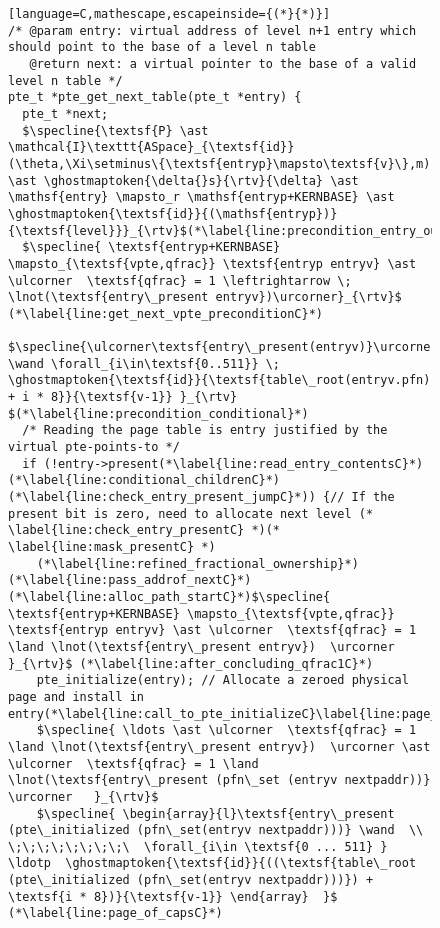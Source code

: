 \begin{figure}\footnotesize
\ifPLDI
\begin{lstlisting}[language=C,mathescape,escapeinside={(*}{*)}]
/* @param entry: virtual address of level n+1 entry which should point to the base of a level n table
   @return next: a virtual pointer to the base of a valid level n table */
pte_t *pte_get_next_table(pte_t *entry) {
  pte_t *next;
  $\specline{\textsf{P} \ast \mathcal{I}\texttt{ASpace}_{\textsf{id}}(\theta,\Xi\setminus\{\textsf{entryp}\mapsto\textsf{v}\},m) \ast \ghostmaptoken{\delta{}s}{\rtv}{\delta} \ast \mathsf{entry} \mapsto_r \mathsf{entryp+KERNBASE} \ast \ghostmaptoken{\textsf{id}}{(\mathsf{entryp})}{\textsf{level}}}_{\rtv}$(*\label{line:precondition_entry_out}*)
  $\specline{ \textsf{entryp+KERNBASE} \mapsto_{\textsf{vpte,qfrac}} \textsf{entryp entryv} \ast \ulcorner  \textsf{qfrac} = 1 \leftrightarrow \; \lnot(\textsf{entry\_present entryv})\urcorner}_{\rtv}$ (*\label{line:get_next_vpte_preconditionC}*)
  $\specline{\ulcorner\textsf{entry\_present(entryv)}\urcorner \wand \forall_{i\in\textsf{0..511}} \; \ghostmaptoken{\textsf{id}}{\textsf{table\_root(entryv.pfn) + i * 8}}{\textsf{v-1}} }_{\rtv} $(*\label{line:precondition_conditional}*) 
  /* Reading the page table is entry justified by the virtual pte-points-to */
  if (!entry->present(*\label{line:read_entry_contentsC}*)(*\label{line:conditional_childrenC}*)(*\label{line:check_entry_present_jumpC}*)) {// If the present bit is zero, need to allocate next level (* \label{line:check_entry_presentC} *)(* \label{line:mask_presentC} *) 
    (*\label{line:refined_fractional_ownership}*)(*\label{line:pass_addrof_nextC}*)(*\label{line:alloc_path_startC}*)$\specline{ \textsf{entryp+KERNBASE} \mapsto_{\textsf{vpte,qfrac}} \textsf{entryp entryv} \ast \ulcorner  \textsf{qfrac} = 1 \land \lnot(\textsf{entry\_present entryv})  \urcorner }_{\rtv}$ (*\label{line:after_concluding_qfrac1C}*)
    pte_initialize(entry); // Allocate a zeroed physical page and install in entry(*\label{line:call_to_pte_initializeC}\label{line:page_of_capsC}*)
    $\specline{ \ldots \ast \ulcorner  \textsf{qfrac} = 1 \land \lnot(\textsf{entry\_present entryv})  \urcorner \ast \ulcorner  \textsf{qfrac} = 1 \land \lnot(\textsf{entry\_present (pfn\_set (entryv nextpaddr))}  \urcorner   }_{\rtv}$
    $\specline{ \begin{array}{l}\textsf{entry\_present (pte\_initialized (pfn\_set(entryv nextpaddr)))} \wand  \\ \;\;\;\;\;\;\;\;\  \forall_{i\in \textsf{0 ... 511} } \ldotp  \ghostmaptoken{\textsf{id}}{((\textsf{table\_root (pte\_initialized (pfn\_set(entryv nextpaddr)))}) + \textsf{i * 8})}{\textsf{v-1}} \end{array}  }$ (*\label{line:page_of_capsC}*)

\end{lstlisting}
\end{figure}
